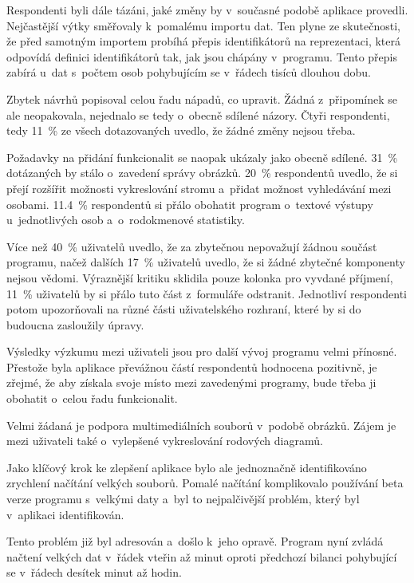 	Respondenti byli dále tázáni, jaké změny by v~současné podobě aplikace provedli. Nejčastější výtky směřovaly k~pomalému importu dat. Ten plyne ze skutečnosti, že před samotným importem probíhá přepis identifikátorů na reprezentaci, která odpovídá definici identifikátorů tak, jak jsou chápány v~programu. Tento přepis zabírá u~dat s~počtem osob pohybujícím se v~řádech tisíců dlouhou dobu.\par
	Zbytek návrhů popisoval celou řadu nápadů, co upravit. Žádná z~připomínek se ale neopakovala, nejednalo se tedy o~obecně sdílené názory. Čtyři respondenti, tedy 11~\% ze všech dotazovaných uvedlo, že žádné změny nejsou třeba.\par
		
	Požadavky na přidání funkcionalit se naopak ukázaly jako obecně sdílené. 31~\% dotázaných by stálo o~zavedení správy obrázků. 20~\% respondentů uvedlo, že si přejí rozšířit možnosti vykreslování stromu a~přidat možnost vyhledávání mezi osobami. 11.4~\% respondentů si přálo obohatit program o~textové výstupy u~jednotlivých osob a~o~rodokmenové statistiky.\par
	
	Více než 40~\% uživatelů uvedlo, že za zbytečnou nepovažují žádnou součást programu, načež dalších 17~\% uživatelů uvedlo, že si žádné zbytečné komponenty nejsou vědomi. Výraznější kritiku sklidila pouze kolonka pro vyvdané příjmení, 11~\% uživatelů by si přálo tuto část z~formuláře odstranit. Jednotliví respondenti potom upozorňovali na různé části uživatelského rozhraní, které by si do budoucna zasloužily úpravy.\par
	
	Výsledky výzkumu mezi uživateli jsou pro další vývoj programu velmi přínosné. Přestože byla aplikace převážnou částí respondentů hodnocena pozitivně, je zřejmé, že aby získala svoje místo mezi zavedenými programy, bude třeba ji obohatit o~celou řadu funkcionalit. \par
	Velmi žádaná je podpora multimediálních souborů v~podobě obrázků. Zájem je mezi uživateli také o~vylepšené vykreslování rodových diagramů.\par
	Jako klíčový krok ke zlepšení aplikace bylo ale jednoznačně identifikováno zrychlení načítání velkých souborů. Pomalé načítání komplikovalo používání beta verze programu s~velkými daty a~byl to nejpalčivější problém, který byl v~aplikaci identifikován.\par
	Tento problém již byl adresován a~došlo k~jeho opravě. Program nyní zvládá načtení velkých dat v~řádek vteřin až minut oproti předchozí bilanci pohybující se v~řádech desítek minut až hodin.\par
	

